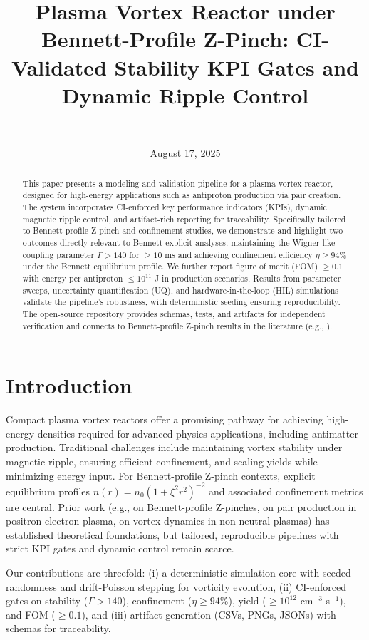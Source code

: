 \documentclass[11pt]{article}
\title{Plasma Vortex Reactor under Bennett-Profile Z-Pinch: CI-Validated Stability KPI Gates and Dynamic Ripple Control}
\author{\authorname\\\texttt{\authoremail}}
\date{August 17, 2025}
\begin{document}
\maketitle
\begin{abstract}
This paper presents a modeling and validation pipeline for a plasma vortex reactor, designed for high-energy applications such as antiproton production via pair creation. The system incorporates CI-enforced key performance indicators (KPIs), dynamic magnetic ripple control, and artifact-rich reporting for traceability. Specifically tailored to Bennett-profile Z-pinch and confinement studies, we demonstrate and highlight two outcomes directly relevant to Bennett-explicit analyses: maintaining the Wigner-like coupling parameter $\Gamma > 140$ for $\geq 10$ ms and achieving confinement efficiency $\eta \geq 94\%$ under the Bennett equilibrium profile. We further report figure of merit (FOM) $\geq 0.1$ with energy per antiproton $\leq 10^{11}$ J in production scenarios. Results from parameter sweeps, uncertainty quantification (UQ), and hardware-in-the-loop (HIL) simulations validate the pipeline's robustness, with deterministic seeding ensuring reproducibility. The open-source repository provides schemas, tests, and artifacts for independent verification and connects to Bennett-profile Z-pinch results in the literature (e.g., \cite{arxiv2506.05727}).
\end{abstract}
\section{Introduction}
Compact plasma vortex reactors offer a promising pathway for achieving high-energy densities required for advanced physics applications, including antimatter production. Traditional challenges include maintaining vortex stability under magnetic ripple, ensuring efficient confinement, and scaling yields while minimizing energy input. For Bennett-profile Z-pinch contexts, explicit equilibrium profiles $n(r)=n_0(1+\xi^2 r^2)^{-2}$ and associated confinement metrics are central. Prior work (e.g., \cite{arxiv2506.05727} on Bennett-profile Z-pinches, \cite{arxiv2207.09093} on pair production in positron-electron plasma, \cite{arxiv2501.13940} on vortex dynamics in non-neutral plasmas) has established theoretical foundations, but tailored, reproducible pipelines with strict KPI gates and dynamic control remain scarce.

Our contributions are threefold: (i) a deterministic simulation core with seeded randomness and drift-Poisson stepping for vorticity evolution, (ii) CI-enforced gates on stability ($\Gamma > 140$), confinement ($\eta \geq 94\%$), yield ($\geq 10^{12}$ cm$^{-3}$ s$^{-1}$), and FOM ($\geq 0.1$), and (iii) artifact generation (CSVs, PNGs, JSONs) with schemas for traceability. 
\end{document}
